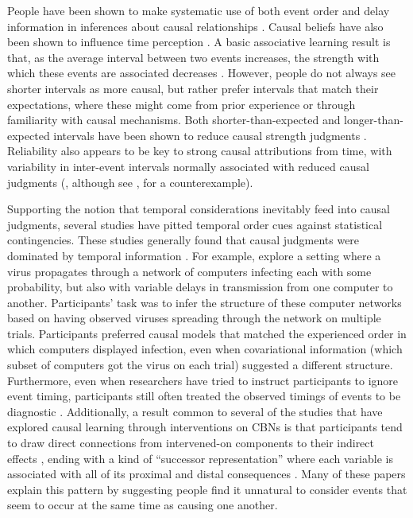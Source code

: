 \documentclass{cambridge7A}%
\begin{document}
People have been shown to make systematic use of both event order \citep{bramley2014order} and delay information in inferences about causal relationships \citep{buehner2003rethinking,buehner2004abolishing,buehner2006temporal}. Causal beliefs have also been shown to influence time perception \citep{bechlivanidis2013does,buehner2009causal,haggard2002voluntary}.  A basic associative learning result is that, as the average interval between two events increases, the strength with which these events are associated decreases \citep{wolfe1921effect,shanks1987associative, grice1948relation}.  However, people do not always see shorter intervals as more causal, but rather prefer intervals that match their expectations, where these might come from prior experience or through familiarity with causal mechanisms.  
Both shorter-than-expected and longer-than-expected intervals have been shown to reduce causal strength judgments \citep{buehner2004abolishing, schlottmann1999seeing,buehner2002knowledge,greville2010temporal,hagmayer2002temporal,buehner2003rethinking,greville2016temporal}.  Reliability also appears to be key to strong causal attributions from time, with variability in inter-event intervals normally associated with reduced causal judgments (\citealp{greville2010temporal,lagnado2010influence,greville2013structural}, although see \citealp{young2009problem}, for a counterexample).

Supporting the notion that temporal considerations inevitably feed into causal judgments, several studies have pitted temporal order cues against statistical contingencies.  These studies generally found that causal judgments were dominated by temporal information \citep{lagnado2006time,lagnado2004advantage,burns2009temporal,schlottmann1999seeing,frosch2012causal}.  For example,  \cite{lagnado2006time} explore a setting where a virus propagates through a network of computers infecting each with some probability, but also with variable delays in transmission from one computer to another. Participants' task was to infer the structure of these computer networks based on having observed viruses spreading through the network on multiple trials.  Participants preferred causal models that matched the experienced order in which computers displayed infection, even when covariational information (which subset of computers got the virus on each trial) suggested a different structure.  Furthermore, even when researchers have tried to instruct participants to ignore event timing, participants still often treated the observed timings of events to be diagnostic \citep{white2006structure,mccormack2016children}.  Additionally, a result common to several of the studies that have explored causal learning through interventions on CBNs is that participants tend to draw direct connections from intervened-on components to their indirect effects \citep{bramley2015fcs, bramley2017neurath, mccormack2016children, fernbach2009causal}, ending with a kind of ``successor representation'' where each variable is associated with all of its proximal and distal consequences \citep{dayan1993improving,momennejad2017successor}.  Many of these papers explain this pattern by suggesting people find it unnatural to consider events that seem to occur at the same time as causing one another.
\end{document}
